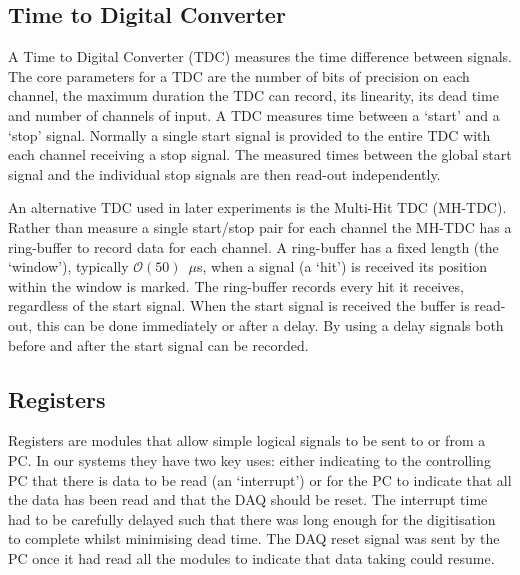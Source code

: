 \subsection{Time to Digital Converter} %
\label{ssub:time_to_digital_converter}
A Time to Digital Converter (TDC) measures the time difference between signals. The core parameters for a TDC are the number of bits of precision on each channel, the maximum duration the TDC can record, its linearity, its dead time and number of channels of input. A TDC measures time between a `start' and a `stop' signal. Normally a single start signal is provided to the entire TDC with each channel receiving a stop signal. The measured times between the global start signal and the individual stop signals are then read-out independently. 

An alternative TDC used in later experiments is the Multi-Hit TDC (MH-TDC). Rather than measure a single start/stop pair for each channel the MH-TDC has a ring-buffer to record data for each channel. A ring-buffer has a fixed length (the `window'), typically \(\mathcal{O}(50)\)~\(\mu\)s, when a signal (a `hit') is received its position within the window is marked. The ring-buffer records every hit it receives, regardless of the start signal. When the start signal is received the buffer is read-out, this can be done immediately or after a delay. By using a delay signals both before and after the start signal can be recorded.


\subsection{Registers} %
\label{ssub:registers}
Registers are modules that allow simple logical signals to be sent to or from a PC. In our systems they have two key uses: either indicating to the controlling PC that there is data to be read (an `interrupt') or for the PC to indicate that all the data has been read and that the DAQ should be reset. The interrupt time had to be carefully delayed such that there was long enough for the digitisation to complete whilst minimising dead time. The DAQ reset signal was sent by the PC once it had read all the modules to indicate that data taking could resume.

